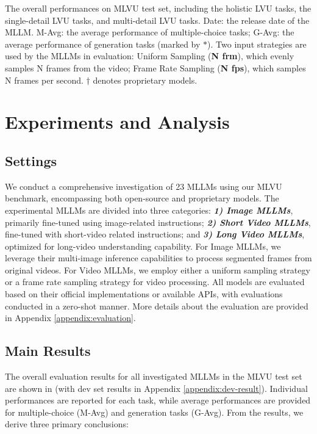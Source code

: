 \begin{table*}[t]
\caption{The overall performances on MLVU test set, including the holistic LVU tasks, the single-detail LVU tasks, and multi-detail LVU tasks. Date: the release date of the MLLM. M-Avg: the average performance of multiple-choice tasks; G-Avg: the average performance of generation tasks (marked by $*$). Two input strategies are used by the MLLMs in evaluation: Uniform Sampling (\textbf{N frm}), which evenly samples N frames from the video; Frame Rate Sampling (\textbf{N fps}), which samples N frames per second. $\dag$ denotes proprietary models.} 
\vspace{-0.5cm}
\label{tab:overall:test}
\end{table*}

\section{Experiments and Analysis}
\label{sec:experiments}

\subsection{Settings}

We conduct a comprehensive investigation of 23 MLLMs using our MLVU benchmark, encompassing both open-source and proprietary models. The experimental MLLMs are divided into three categories: \textbf{\textit{1) Image MLLMs}}, primarily fine-tuned using image-related instructions; \textbf{\textit{2) Short Video MLLMs}}, fine-tuned with short-video related instructions; and \textbf{\textit{3) Long Video MLLMs}}, optimized for long-video understanding capability. For Image MLLMs, we leverage their multi-image inference capabilities to process segmented frames from original videos. For Video MLLMs, we employ either a uniform sampling strategy or a frame rate sampling strategy for video processing. All models are evaluated based on their official implementations or available APIs, with evaluations conducted in a zero-shot manner. More details about the evaluation are provided in Appendix \ref{appendix:evaluation}. 

\subsection{Main Results}

The overall evaluation results for all investigated MLLMs in the MLVU test set are shown in  (with dev set results in Appendix \ref{appendix:dev-result}). Individual performances are reported for each task, while average performances are provided for multiple-choice (M-Avg) and generation tasks (G-Avg). From the results, we derive three primary conclusions:

